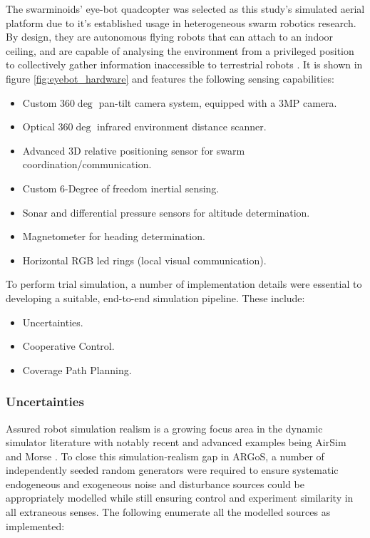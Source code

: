 \documentclass{report}
\begin{document}
The swarminoids' \cite{Dorigo2013} eye-bot quadcopter was selected as this study's simulated aerial platform due to it's established usage in heterogeneous swarm robotics research. By design, they are autonomous flying robots that can attach to an indoor ceiling, and are capable of analysing the environment from a privileged position to collectively gather information inaccessible to terrestrial robots \cite{Dorigo2013}. It is shown in figure \ref{fig:eyebot_hardware} and features the following sensing capabilities:
\begin{itemize}
    \item Custom $360\deg$ pan-tilt camera system, equipped with a 3MP camera.
    \item Optical $360\deg$ infrared environment distance scanner.
    \item Advanced 3D relative positioning sensor for swarm coordination/communication.
    \item Custom 6-Degree of freedom inertial sensing.
    \item Sonar and differential pressure sensors for altitude determination.
    \item Magnetometer for heading determination.
    \item Horizontal RGB led rings (local visual communication).
\end{itemize}

To perform trial simulation, a number of implementation details were essential to developing a suitable, end-to-end simulation pipeline. These include:
\begin{itemize}
	\item Uncertainties.
	\item Cooperative Control.
	\item Coverage Path Planning.
\end{itemize}

\subsubsection{Uncertainties}
Assured robot simulation realism is a growing focus area \cite{Taylor2014} in the dynamic simulator literature with notably recent and advanced examples being AirSim \cite{Shah2018} and Morse \cite{Morse2011} \cite{Lemaignan2014}. To close this simulation-realism gap in ARGoS, a number of independently seeded random generators were required to ensure systematic endogeneous and exogeneous noise and disturbance sources could be appropriately modelled while still ensuring control and experiment similarity in all extraneous senses. The following enumerate all the modelled sources as implemented:
\end{document}
